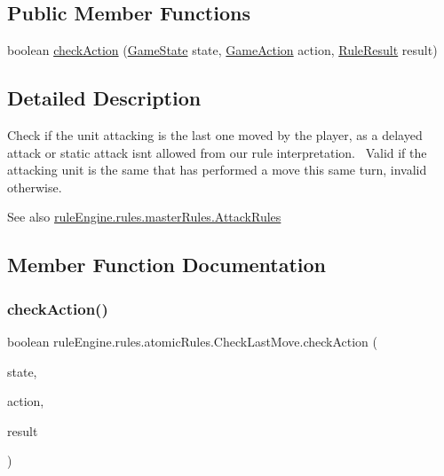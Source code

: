 \subsection*{Public Member Functions}
\begin{DoxyCompactItemize}
\item 
boolean \mbox{\hyperlink{classrule_engine_1_1rules_1_1atomic_rules_1_1_check_last_move_a1af50d2d1a89a15746df969f1925f66c}{check\+Action}} (\mbox{\hyperlink{classgame_1_1game_state_1_1_game_state}{Game\+State}} state, \mbox{\hyperlink{classrule_engine_1_1_game_action}{Game\+Action}} action, \mbox{\hyperlink{classrule_engine_1_1_rule_result}{Rule\+Result}} result)
\end{DoxyCompactItemize}


\subsection{Detailed Description}
Check if the unit attacking is the last one moved by the player, as a delayed attack or static attack isn\textquotesingle{}t allowed from our rule interpretation.~\newline
 Valid if the attacking unit is the same that has performed a move this same turn, invalid otherwise.

\begin{DoxySeeAlso}{See also}
\mbox{\hyperlink{classrule_engine_1_1rules_1_1master_rules_1_1_attack_rules}{rule\+Engine.\+rules.\+master\+Rules.\+Attack\+Rules}} 
\end{DoxySeeAlso}


\subsection{Member Function Documentation}
\mbox{\label{classrule_engine_1_1rules_1_1atomic_rules_1_1_check_last_move_a1af50d2d1a89a15746df969f1925f66c}} 
\subsubsection{\texorpdfstring{check\+Action()}{checkAction()}}
{\footnotesize\ttfamily boolean rule\+Engine.\+rules.\+atomic\+Rules.\+Check\+Last\+Move.\+check\+Action (\begin{DoxyParamCaption}\item[{\mbox{\hyperlink{classgame_1_1game_state_1_1_game_state}{Game\+State}}}]{state,  }\item[{\mbox{\hyperlink{classrule_engine_1_1_game_action}{Game\+Action}}}]{action,  }\item[{\mbox{\hyperlink{classrule_engine_1_1_rule_result}{Rule\+Result}}}]{result }\end{DoxyParamCaption})\hspace{0.3cm}{\ttfamily [inline]}}



